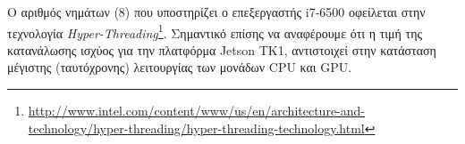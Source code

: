 Ο αριθμός νημάτων (8) που υποστηρίζει ο επεξεργαστής i7-6500 οφείλεται στην
τεχνολογία \emph{Hyper-Threading}\footnote{\url{http://www.intel.com/content/www/us/en/architecture-and-technology/hyper-threading/hyper-threading-technology.html}}.
Σημαντικό επίσης να αναφέρουμε ότι η τιμή της κατανάλωσης ισχύος για την
πλατφόρμα Jetson TK1, αντιστοιχεί στην κατάσταση μέγιστης (ταυτόχρονης) λειτουργίας των μονάδων
CPU και GPU.



